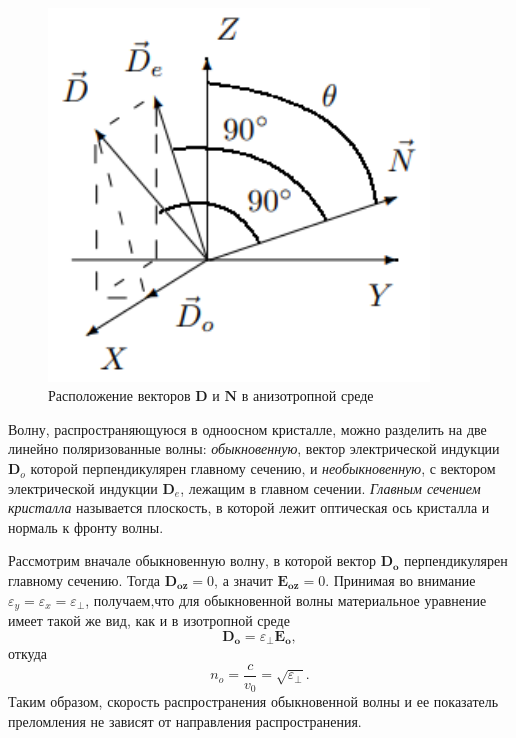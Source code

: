 \documentclass[a4paper,12pt]{article}
\begin{document}
\begin{figure}\label{fig: Vectors' location crystal}
    \begin{center}
    \vspace{-20pt}
        \includegraphics[width = 0.9\textwidth]{Vectors' location crystal.png}
    \end{center}
    \caption{Расположение векторов $\mathbf{D}$ и $\mathbf{N}$ в анизотропной среде}
\end{figure}
Волну, распространяющуюся в одноосном кристалле, можно разделить на две линейно
поляризованные волны: \textit{обыкновенную}, вектор электрической индукции $\mathbf{D}_o$ которой перпендикулярен главному сечению, и \textit{необыкновенную}, с вектором электрической индукции
$\mathbf{D}_e$, лежащим в главном сечении. \textit{Главным сечением кристалла} называется плоскость, в которой лежит оптическая ось кристалла и нормаль к фронту волны.

Рассмотрим вначале обыкновенную волну, в которой вектор $\mathbf{D_o}$ перпендикулярен главному сечению. Тогда $\mathbf{D_{oz}} = 0$, а значит $\mathbf{E_{oz}} = 0$. Принимая во внимание $\varepsilon_y = \varepsilon_x = 
\varepsilon_{\perp}$, получаем,что для обыкновенной волны материальное уравнение имеет такой же вид, как и в изотропной среде
\[\mathbf{D_{o}} = \varepsilon_{\perp} \mathbf{E_{o}},\]
откуда 
\[n_o = \frac{c}{v_0} = \sqrt{\varepsilon_{\perp}}.\]
Таким образом, скорость распространения обыкновенной волны
и ее показатель преломления не зависят от направления распространения.
\end{document}
